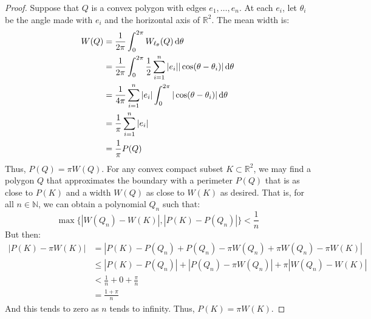 \documentclass[crop=false,class=book,oneside]{standalone}
\begin{document}
            \begin{proof}
            Suppose that $Q$ is a convex polygon with edges
            $e_1,\hdots, e_n$. At each $e_i$, let $\theta_i$ be the
            angle made with $e_i$ and the horizontal axis of $\mathbb{R}^2$.
            The mean width is:
            \begin{subequations}
                \begin{align}
                    W(Q)&=\frac{1}{2\pi}\int_{0}^{2\pi}
                        W_{\ell_\theta}(Q)\mathop{}\!\mathrm{d}{\theta}\\
                    &=\frac{1}{2\pi}\int_{0}^{2\pi}\frac{1}{2}
                        \sum_{i=1}^{n} |e_i|
                        |\cos(\theta-\theta_i)|\mathop{}\!\mathrm{d}{\theta}\\
                    &=\frac{1}{4\pi}\sum_{i=1}^{n}|e_{i}|\int_{0}^{2\pi}
                        |\cos(\theta-\theta_i)|\mathop{}\!\mathrm{d}{\theta}\\
                    &=\frac{1}{\pi}\sum_{i=1}^{n}|e_i|\\
                    &=\frac{1}{\pi}P(Q)
                \end{align}
            \end{subequations}
            Thus, $P(Q) = \pi W(Q)$. For any convex compact
            subset $K\subset \mathbb{R}^2$, we may find a polygon $Q$
            that approximates the boundary with a perimeter $P(Q)$
            that is as close to $P(K)$ and a width $W(Q)$ as close
            to $W(K)$ as desired. That is, for all $n\in \mathbb{N}$,
            we can obtain a polynomial $Q_{n}$ such that:
            \begin{equation}
                \max\{|W(Q_n)-W(K)|,|P(K)-P(Q_n)|\}<\frac{1}{n}
            \end{equation}
            But then:
            \begin{subequations}
                \begin{align}
                    |P(K)-\pi W(K)|&=
                    |P(K)-P(Q_n)+P(Q_n)-\pi{W}(Q_n)+\pi{W}(Q_n)-\pi{W}(K)|\\
                    &\leq|P(K)-P(Q_n)|+|P(Q_n)-\pi{W}(Q_n)|+\pi|W(Q_n)-W(K)|\\
                    &<\frac{1}{n}+0+\frac{\pi}{n}\\
                    &=\frac{1+\pi}{n}
                \end{align}
            \end{subequations}
            And this tends to zero as $n$ tends to infinity.
            Thus, $P(K)=\pi{W}(K)$.
            \end{proof}
\end{document}
